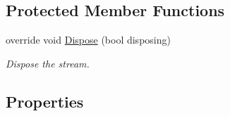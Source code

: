 \subsection*{Protected Member Functions}
\begin{DoxyCompactItemize}
\item 
override void \mbox{\hyperlink{class_super_tiled2_unity_1_1_ionic_1_1_zip_1_1_zip_input_stream_a27f6b4a5f9fd86beaf360d8b1594b91d}{Dispose}} (bool disposing)
\begin{DoxyCompactList}\small\item\em Dispose the stream. \end{DoxyCompactList}\end{DoxyCompactItemize}
\subsection*{Properties}
